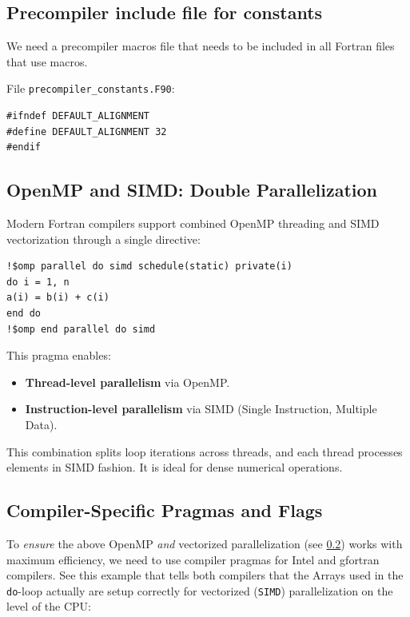 \documentclass{article}
\begin{document}
\subsection{Precompiler include file for constants}

We need a precompiler macros file that needs to be included in all Fortran
files that use macros.

\vspace{1em}%
\noindent{}File \texttt{precompiler\_constants.F90}:
\begin{verbatim}
#ifndef DEFAULT_ALIGNMENT
#define DEFAULT_ALIGNMENT 32
#endif
\end{verbatim}

\subsection{OpenMP and SIMD: Double Parallelization}
\label{thread_and_vectorized_parallelization}
Modern Fortran compilers support combined OpenMP threading and SIMD vectorization through a single directive:

\begin{verbatim}
!$omp parallel do simd schedule(static) private(i)
do i = 1, n
a(i) = b(i) + c(i)
end do
!$omp end parallel do simd
\end{verbatim}

This pragma enables:
\begin{itemize}
\item \textbf{Thread-level parallelism} via OpenMP.
\item \textbf{Instruction-level parallelism} via SIMD (Single Instruction, Multiple Data).
\end{itemize}

This combination splits loop iterations across threads, and each thread processes elements in SIMD fashion. It is ideal for dense numerical operations.

\subsection{Compiler-Specific Pragmas and Flags}

To \emph{ensure} the above OpenMP \emph{and} vectorized parallelization (see
\ref{thread_and_vectorized_parallelization}) works with maximum efficiency, we
need to use compiler pragmas for Intel and gfortran compilers. See this example
that tells both compilers that the Arrays used in the \texttt{do}-loop actually
are setup correctly for vectorized (\texttt{SIMD}) parallelization on the level
of the CPU:
\end{document}
